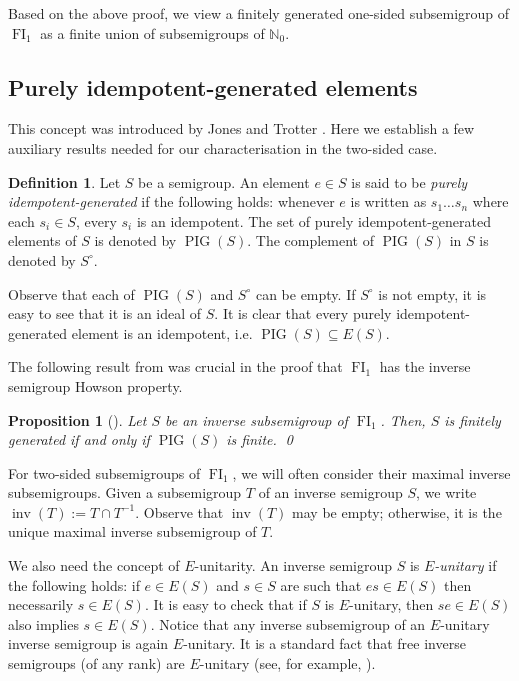 \documentclass[reqno]{amsart}
\theoremstyle{plain}
\newtheorem{prop}[lem]{Proposition}
\theoremstyle{definition}
\newtheorem{defn}[lem]{Definition}
\DeclareMathOperator{\inv}{inv}
\DeclareMathOperator{\PIG}{PIG}
\DeclareMathOperator{\FI}{FI}
\numberwithin{equation}{section}
\begin{document}
Based on the above proof, we view a finitely generated one-sided subsemigroup of $\FI_1$ as a finite union of subsemigroups of $\mathbb{N}_0$.

\subsection{Purely idempotent-generated elements}
\label{subsec:PIG}

This concept was introduced by Jones and Trotter \cite{JonesTrotter}. Here we establish
a few auxiliary results needed for our characterisation in the two-sided case.


\begin{defn}
\label{defn:PIG}
Let $S$ be a semigroup. An element $e\in S$ is said to be \emph{purely idempotent-generated} if the following holds: whenever $e$ is written as $s_1\dots s_n$ where each $s_i\in S$, every $s_i$ is an idempotent. The set of purely idempotent-generated elements of $S$ is denoted by $\PIG(S)$. The complement of $\PIG(S)$ in $S$ is denoted by $S^\circ$. 
\end{defn}

Observe that each of $\PIG(S)$ and $S^\circ$ can be empty. If $S^\circ$ is not empty, it is easy to see that it is an ideal of $S$. It is clear that every purely idempotent-generated element is an idempotent, i.e. $\PIG(S)\subseteq E(S)$.

The following result from \cite{JonesTrotter} was crucial in the proof that $\FI_1$ has the inverse semigroup Howson property.

\begin{prop}[{\cite[Proposition 1.5]{JonesTrotter}}]
\label{prop:JonesTrotterPIG}
Let $S$ be an inverse subsemigroup of $\FI_1$. Then, $S$ is finitely generated if and only if $\PIG(S)$ is finite. \qed
\end{prop}



For two-sided subsemigroups of $\FI_1$, we will often consider their maximal inverse subsemigroups. Given a subsemigroup $T$ of an inverse semigroup $S$, we write $\inv(T) := T\cap T^{-1}$. Observe that $\inv(T)$ may be empty; otherwise, it is the unique maximal inverse subsemigroup of $T$.


We also need the concept of $E$-unitarity.
An inverse semigroup $S$
is \emph{$E$-unitary} if the following holds: if $e\in E(S)$ and $s\in S$
are such that $es\in E(S)$ then necessarily $s\in E(S)$. It is easy to check that if $S$ is $E$-unitary, then $se\in E(S)$ also implies $s\in E(S)$. 
Notice that any inverse subsemigroup of an $E$-unitary inverse semigroup is again $E$-unitary. It is a standard fact that free inverse semigroups (of any rank) are $E$-unitary (see, for example, \cite[Chapter 6]{Lawson}).
\end{document}
